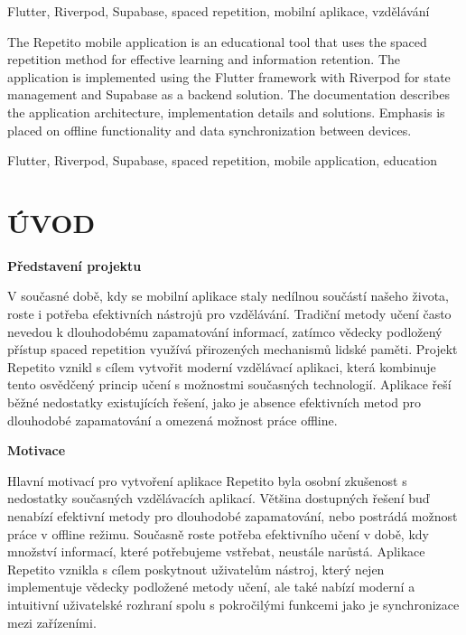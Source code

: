 \documentclass[12pt, a4paper, oneside]{report}
\begin{document}
	\noindent Flutter, Riverpod, Supabase, spaced repetition, mobilní aplikace, vzdělávání

	\vspace{18pt}
	The Repetito mobile application is an educational tool that uses the spaced repetition method for effective learning and information retention. The application is implemented using the Flutter framework with Riverpod for state management and Supabase as a backend solution. The documentation describes the application architecture, implementation details and solutions. Emphasis is placed on offline functionality and data synchronization between devices.

	\vspace{18pt}

	\noindent Flutter, Riverpod, Supabase, spaced repetition, mobile application, education

\newcommand{\introsubheading}[1]{%
  {\noindent\textbf{\normalsize #1}\vspace{1pt}\par}%
}

\chapter*{ÚVOD}

\introsubheading{Představení projektu}
V současné době, kdy se mobilní aplikace staly nedílnou součástí našeho života, roste i potřeba efektivních nástrojů pro vzdělávání. Tradiční metody učení často nevedou k dlouhodobému zapamatování informací, zatímco vědecky podložený přístup spaced repetition využívá přirozených mechanismů lidské paměti. Projekt Repetito vznikl s cílem vytvořit moderní vzdělávací aplikaci, která kombinuje tento osvědčený princip učení s možnostmi současných technologií. Aplikace řeší běžné nedostatky existujících řešení, jako je absence efektivních metod pro dlouhodobé zapamatování a omezená možnost práce offline.

\introsubheading{Motivace}
Hlavní motivací pro vytvoření aplikace Repetito byla osobní zkušenost s nedostatky současných vzdělávacích aplikací. Většina dostupných řešení buď nenabízí efektivní metody pro dlouhodobé zapamatování, nebo postrádá možnost práce v offline režimu. Současně roste potřeba efektivního učení v době, kdy množství informací, které potřebujeme vstřebat, neustále narůstá. Aplikace Repetito vznikla s cílem poskytnout uživatelům nástroj, který nejen implementuje vědecky podložené metody učení, ale také nabízí moderní a intuitivní uživatelské rozhraní spolu s pokročilými funkcemi jako je synchronizace mezi zařízeními.
\end{document}
